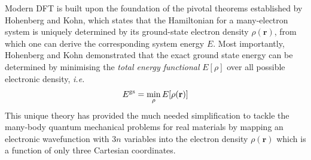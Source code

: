 

Modern DFT is built upon the foundation of the pivotal theorems established by Hohenberg and Kohn,\cite{kohn1999nobel} which states that the  Hamiltonian for a many-electron system is uniquely determined by its ground-state electron density $\rho(\bm{r})$, from which one can derive the corresponding system energy $E$. Most importantly, Hohenberg and Kohn demonstrated that the exact ground state energy can be determined by minimising the \textit{total energy functional} $E[\rho]$ over all possible electronic density, \emph{i.e.}
\begin{equation}\label{eq:DFT_min_rho}
E^{\mbox{\scriptsize{gs}}}=\min_{\rho}E[\rho(\mathbf{r})]    
\end{equation} 
This unique theory has provided the much needed simplification to tackle the many-body quantum mechanical problems for real materials by mapping an electronic wavefunction with $3n$ variables into the electron density $\rho(\bm{r})$ which is a function of only  three Cartesian coordinates. 

